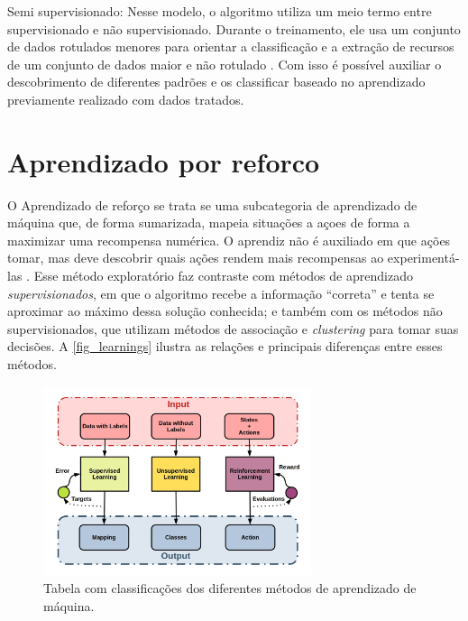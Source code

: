 Semi supervisionado: Nesse modelo, o algoritmo utiliza um meio termo
entre supervisionado e não supervisionado. Durante o treinamento, ele
usa um conjunto de dados rotulados menores para orientar a
classificação e a extração de recursos de um conjunto de dados maior e
não rotulado \cite{uibm2022}. Com isso é possível auxiliar o
descobrimento de diferentes padrões e os classificar baseado no
aprendizado previamente realizado com dados tratados.

\section{Aprendizado por reforco}

O Aprendizado de refor{\c c}o se trata se uma subcategoria de
aprendizado de m{\'a}quina que, de forma sumarizada, mapeia situa{\c
  c}{\~o}es a a{\c c}oes de forma a maximizar uma recompensa
num{\'e}rica. O aprendiz n{\~a}o {\'e} auxiliado em que a{\c c}{\~o}es
tomar, mas deve descobrir quais a{\c c}{\~o}es rendem mais recompensas
ao experiment{\'a}-las \cite{kaelbling1996}. Esse m{\'e}todo
explorat{\'o}rio faz contraste com m{\'e}todos de aprendizado
\textit{supervisionados}, em que o algoritmo recebe a informa{\c
  c}{\~a}o ``correta'' e tenta se aproximar ao m{\'a}ximo dessa
solu{\c c}{\~a}o conhecida; e tamb{\'e}m com os m{\'e}todos n{\~a}o
supervisionados, que utilizam m{\'e}todos de associa{\c c}{\~a}o e
\textit{clustering} para tomar suas decis{\~o}es. A
\autoref{fig_learnings} ilustra as rela{\c c}{\~o}es e principais
diferen{\c c}as entre esses m{\'e}todos.

\begin{figure}[htb]
  \centering
  \caption{\label{fig_learnings}Tabela com classifica{\c c}{\~o}es dos diferentes m{\'e}todos de aprendizado de m{\'a}quina.}
  \includegraphics[width=0.7\textwidth]{images/unsupervised_supervised_reinforcement.jpeg}
\end{figure}

